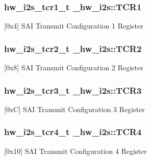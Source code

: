 \subsubsection[{\texorpdfstring{T\+C\+R1}{TCR1}}]{ {\bf hw\+\_\+i2s\+\_\+tcr1\+\_\+t} \+\_\+hw\+\_\+i2s\+::\+T\+C\+R1}\hypertarget{struct__hw__i2s_ab9b4557e97e7dfe8659c27221d63eb63}{}\label{struct__hw__i2s_ab9b4557e97e7dfe8659c27221d63eb63}
\mbox{[}0x4\mbox{]} S\+AI Transmit Configuration 1 Register 
\subsubsection[{\texorpdfstring{T\+C\+R2}{TCR2}}]{ {\bf hw\+\_\+i2s\+\_\+tcr2\+\_\+t} \+\_\+hw\+\_\+i2s\+::\+T\+C\+R2}\hypertarget{struct__hw__i2s_ae98677d9a4368245d7cdecff34f4349c}{}\label{struct__hw__i2s_ae98677d9a4368245d7cdecff34f4349c}
\mbox{[}0x8\mbox{]} S\+AI Transmit Configuration 2 Register 
\subsubsection[{\texorpdfstring{T\+C\+R3}{TCR3}}]{ {\bf hw\+\_\+i2s\+\_\+tcr3\+\_\+t} \+\_\+hw\+\_\+i2s\+::\+T\+C\+R3}\hypertarget{struct__hw__i2s_a7f168982d01160651251e409c1e3d604}{}\label{struct__hw__i2s_a7f168982d01160651251e409c1e3d604}
\mbox{[}0xC\mbox{]} S\+AI Transmit Configuration 3 Register 
\subsubsection[{\texorpdfstring{T\+C\+R4}{TCR4}}]{ {\bf hw\+\_\+i2s\+\_\+tcr4\+\_\+t} \+\_\+hw\+\_\+i2s\+::\+T\+C\+R4}\hypertarget{struct__hw__i2s_a8adfe976671f876834d369bc67ea2a76}{}\label{struct__hw__i2s_a8adfe976671f876834d369bc67ea2a76}
\mbox{[}0x10\mbox{]} S\+AI Transmit Configuration 4 Register 
